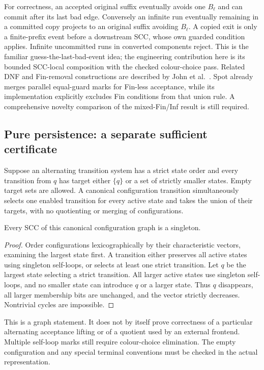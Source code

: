 For correctness, an accepted original suffix eventually avoids one
$B_\ell$ and can commit after its last bad edge. Conversely an infinite
run eventually remaining in a committed copy projects to an original
suffix avoiding $B_\ell$. A copied exit is only a finite-prefix event
before a downstream SCC, whose own guarded condition applies. Infinite
uncommitted runs in converted components reject. This is the familiar
guess-the-last-bad-event idea; the engineering contribution here is its
bounded SCC-local composition with the checked colour-choice pass.
Related DNF and Fin-removal constructions are described by
John et al.~\cite{JohnJSBK21}. Spot already merges parallel equal-guard
marks for Fin-less acceptance, while its implementation explicitly
excludes Fin conditions from that union rule. A comprehensive novelty
comparison of the mixed-Fin/Inf result is still required.

\subsection{Pure persistence: a separate sufficient certificate}
Suppose an alternating transition system has a strict state order and
every transition from $q$ has target either $\{q\}$ or a set of strictly
smaller states. Empty target sets are allowed. A canonical configuration
transition simultaneously selects one enabled transition for every active
state and takes the union of their targets, with no quotienting or merging
of configurations.

\begin{proposition}
Every SCC of this canonical configuration graph is a singleton.
\end{proposition}
\begin{proof}
Order configurations lexicographically by their characteristic vectors,
examining the largest state first. A transition either preserves all
active states using singleton self-loops, or selects at least one strict
transition. Let $q$ be the largest state selecting a strict transition.
All larger active states use singleton self-loops, and no smaller state
can introduce $q$ or a larger state. Thus $q$ disappears, all larger
membership bits are unchanged, and the vector strictly decreases.
Nontrivial cycles are impossible.
\end{proof}

This is a graph statement. It does not by itself prove correctness of a
particular alternating acceptance lifting or of a quotient used by an
external frontend. Multiple self-loop marks still require colour-choice
elimination. The empty configuration and any special terminal conventions
must be checked in the actual representation.

